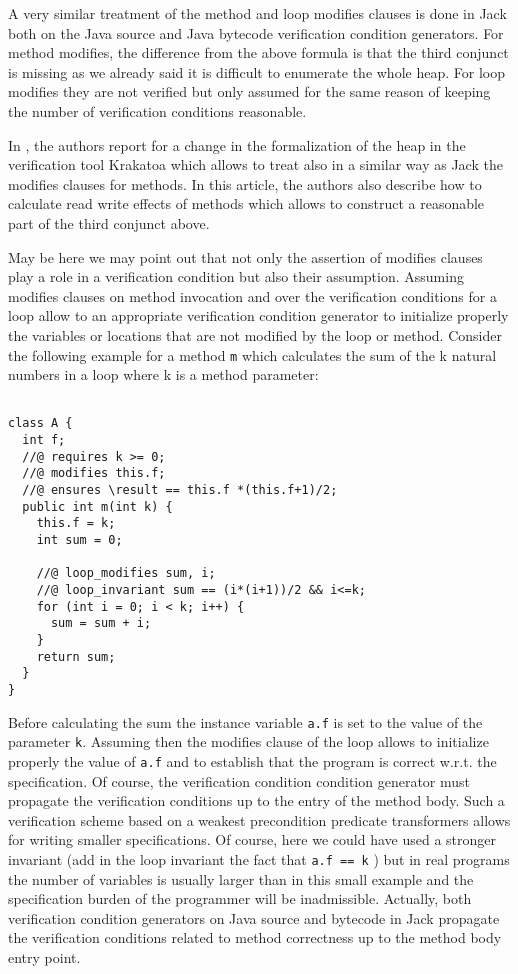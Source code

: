 A very similar treatment of the  method and loop modifies clauses is done in Jack both on the Java source and Java bytecode verification condition generators.
For method modifies,  the difference  from the above formula is that the third conjunct is missing as we already said it is difficult to enumerate the 
whole heap. For loop modifies they are not verified but only assumed for the same reason of keeping the number of verification conditions reasonable. 


 In \cite{marche05tphols}, the authors report for a change in the formalization of the heap in the verification tool Krakatoa which allows
to treat also in a similar way as Jack the modifies clauses for methods. In this article, the authors also describe how to calculate read write effects of methods which
 allows  to construct a reasonable part of the  third conjunct above. 

May be here we may point out that not only the assertion of modifies clauses play a role in a verification condition but also their assumption.
Assuming  modifies clauses on method invocation  and over the verification conditions for a loop allow to an appropriate verification condition generator to
 initialize properly the variables or locations that are not modified by the loop or method. Consider the following example for a method
 \lstinline!m! which calculates the sum of the k natural numbers in a loop where k is a method parameter:


\begin{lstlisting}[frame=trbl]

class A { 
  int f;
  //@ requires k >= 0;
  //@ modifies this.f;
  //@ ensures \result == this.f *(this.f+1)/2;
  public int m(int k) {
    this.f = k;
    int sum = 0;
	    
    //@ loop_modifies sum, i;
    //@ loop_invariant sum == (i*(i+1))/2 && i<=k;
    for (int i = 0; i < k; i++) {
      sum = sum + i;
    }
    return sum;
  }
}
\end{lstlisting} 

 Before calculating the sum the instance variable \lstinline!a.f! is set to the value of the parameter  \lstinline!k!.
 Assuming then the modifies clause of the loop allows to initialize properly the value of \lstinline!a.f! and to  establish that
 the program  is correct w.r.t. the specification. Of course, the verification condition condition generator 
 must propagate the verification conditions up to the entry of the method body. 
 Such a verification  scheme based on a weakest precondition predicate transformers allows for writing smaller specifications. 
 Of course, here we could have used a stronger invariant (add in the loop invariant the fact that \lstinline!a.f == k! )
 but in real programs the number of variables is usually larger than in this small example and the specification burden of the programmer will be inadmissible.
 Actually, both verification condition generators on  Java source and bytecode in Jack propagate the verification conditions related to method correctness
 up to the method body entry point. 

